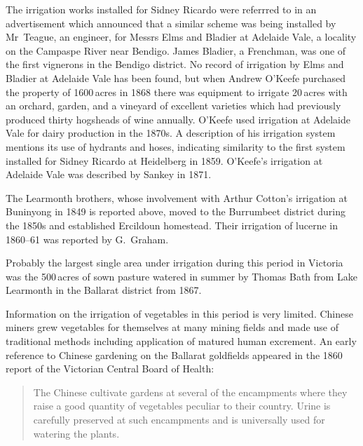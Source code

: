 The irrigation works installed for Sidney Ricardo were referrred to in
an advertisement which announced that a similar scheme was being
installed by Mr~Teague, an engineer, for Messrs Elms and Bladier at
Adelaide Vale, a locality on the Campaspe River 
near Bendigo.  James Bladier, 
a Frenchman, was one of the first vignerons  in the
Bendigo district.  No record of irrigation by Elms and Bladier at
Adelaide Vale  has been found, but when
Andrew O'Keefe  purchased the property of
1600\,acres in 1868 there was equipment to irrigate 20\,acres with an
orchard,
 garden,  and a
vineyard  of excellent varieties which had previously
produced thirty hogsheads of wine annually.  O'Keefe used irrigation
at Adelaide Vale for dairy  production in the 1870s.  A
description of his irrigation system mentions its use of hydrants and
hoses, indicating similarity to the first system installed for Sidney
Ricardo at Heidelberg in 1859.  O'Keefe's irrigation at Adelaide Vale
was described by Sankey in 1871.

The Learmonth brothers,  whose involvement with
Arthur Cotton's irrigation at Buninyong in 1849 is reported above,
moved to the Burrumbeet  district during the
1850s and established Ercildoun 
homestead. Their irrigation of lucerne  in 1860--61 was
reported by G.~Graham.

Probably the largest single area under irrigation during this period
in Victoria was the 500\,acres of sown pasture watered in summer by
Thomas Bath  from Lake Learmonth
 in the Ballarat 
district from 1867.

Information on the irrigation of vegetables in this period is very
limited.  Chinese miners  grew vegetables for
themselves at many mining fields and made use of traditional methods
including application of matured human excrement.  An early reference to Chinese gardening on the Ballarat
goldfields appeared in the 1860 report of the Victorian Central Board
of Health:
\begin{quote}
	The Chinese cultivate gardens at several of the encampments
	where they raise a good quantity of vegetables peculiar to
	their country.  Urine is carefully preserved at such
	encampments and is universally used for watering the
	plants.
\end{quote}

